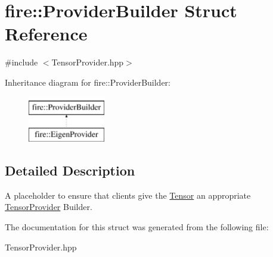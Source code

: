 \hypertarget{a00032}{}\section{fire\+:\+:Provider\+Builder Struct Reference}
\label{a00032}


{\ttfamily \#include $<$Tensor\+Provider.\+hpp$>$}

Inheritance diagram for fire\+:\+:Provider\+Builder\+:\begin{figure}[H]
\begin{center}
\leavevmode
\includegraphics[height=2.000000cm]{a00032}
\end{center}
\end{figure}


\subsection{Detailed Description}
A placeholder to ensure that clients give the \hyperlink{a00046}{Tensor} an appropriate \hyperlink{a00047}{Tensor\+Provider} Builder. 

The documentation for this struct was generated from the following file\+:\begin{DoxyCompactItemize}
\item 
Tensor\+Provider.\+hpp\end{DoxyCompactItemize}
